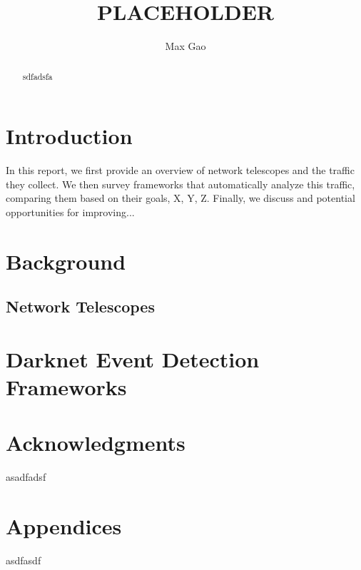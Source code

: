 \documentclass[manuscript,nonacm]{acmart}
\begin{document}
\title{PLACEHOLDER}
\author{Max Gao}

\begin{abstract}
sdfadsfa
\end{abstract}

\maketitle

\section{Introduction}

In this report, we first provide an overview of network telescopes and the traffic they collect. 
We then survey frameworks that automatically analyze this traffic, comparing them based on their goals, X, Y, Z.
Finally, we discuss and potential opportunities for improving...

\section{Background}

\subsection{Network Telescopes}

\section{Darknet Event Detection Frameworks}


\section{}


\section{Acknowledgments}
asadfadsf

\section{Appendices}

asdfasdf
\end{document}
